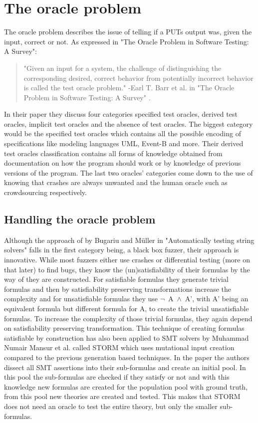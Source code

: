 \section{The oracle problem}
\label{fuzzing:OracleProblem}
The oracle problem describes the issue of telling if a PUTs output was, given the input, correct or not. As expressed in "The Oracle Problem in Software Testing: A Survey": 
\begin{quote}
	"Given an input for a system, the challenge of distinguishing the corresponding desired, correct behavior from potentially incorrect behavior is called the test oracle problem."
	\newline
	-Earl T. Barr et al. in "The Oracle Problem in Software Testing: A Survey" \cite{10barr2014oracleProblem}.
\end{quote}
In their paper they discuss four categories specified test oracles, derived test oracles, implicit test oracles and the absence of test oracles. The biggest category would be the specified test oracles which contains all the possible encoding of specifications like modeling languages UML, Event-B and more. Their derived test oracles classification contains all forms of knowledge obtained from documentation on how the program should work or by knowledge of previous versions of the program. The last two oracles' categories come down to the use of knowing that crashes are always unwanted and the human oracle such as crowdsourcing respectively.

\subsection{Handling the oracle problem}
\label{fuzzing:handelingOracelproblem}
Although the approach of by Bugariu and M\"uller in "Automatically testing string solvers" \cite{9bugariu2020automaticallyTestingStringSolvers} falls in the first category being, a black box fuzzer, their approach is innovative. While most fuzzers either use crashes or differential testing (more on that later) to find bugs, they know the (un)satisfiability of their formulas by the way of they are constructed. For satisfiable formulas they generate trivial formulas and then by satisfiability preserving transformations increase the complexity and for unsatisfiable formulas they use \mbox{$\neg$ A $\land$ A'}, with A' being an equivalent formula but different formula for A, to create the trivial unsatisfiable formulas. To increase the complexity of those trivial formulas, they again depend on satisfiability preserving transformation. This technique of creating formulas satisfiable by construction has also been applied to SMT solvers by Muhammad Numair Mansur et al. called STORM \cite{1mansur2020detecting} which uses mutational input creation compared to the previous generation based techniques. In the paper the authors dissect all SMT assertions into their sub-formulas and create an initial pool. In this pool the sub-formulas are checked if they satisfy or not and with this knowledge new formulas are created for the population pool with ground truth, from this pool new theories are created and tested. This makes that STORM does not need an oracle to test the entire theory, but only the smaller sub-formulas.


